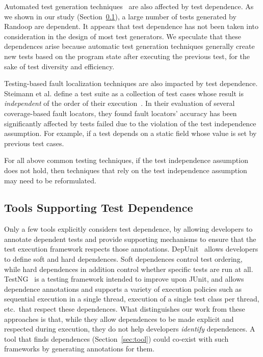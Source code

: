 Automated test generation techniques~\cite{} are also affected
by test dependence. As we shown in our study (Section~\ref{}),
a large number of tests generated by Randoop are dependent.
It appears that test dependence has not been taken into
consideration in the design of most test generators.
We speculate that these dependences arise because automatic
test generation techniques generally create new tests
based on the program state after executing the previous test,
for the sake of test diversity and efficiency. 

Testing-based fault localization techniques are also impacted
by test dependence. Steimann et al. define a test suite as a
collection of test cases whose result is \textit{independent}
of the order of their execution~\cite{Steimann:2013}.
In their evaluation of several coverage-based fault locators, they found
fault locators' accuracy has been significantly affected
by tests failed due to the violation of the test independence assumption.
For example, if a test depends on a static field whose value is
set by previous test cases.  


For all above common testing techniques, if the test independence
assumption does not hold, then techniques that rely on
the test independence assumption may need to be reformulated.

\subsection{Tools Supporting Test Dependence}

Only a few tools explicitly considers test dependence, by
allowing developers to annotate dependent tests and
provide supporting mechanisms to ensure that the test execution framework
respects those annotations.  DepUnit~\cite{depunit}
allows developers to define soft and hard dependences. Soft dependences control
test ordering, while hard dependences in addition control whether specific tests are
run at all.  TestNG~\cite{testng} is a testing framework intended to improve upon JUnit,
and allows dependence annotations and supports a variety of execution policies such as sequential execution
in a single thread, execution of a single test class per thread, etc.\
that respect these dependences.
What distinguishes our work from these approaches is that, while they allow dependences
to be made explicit and respected during execution, they do not help developers
\emph{identify} dependences.  A tool that finds dependences (Section~\ref{sec:tool}) could co-exist
with such frameworks by generating annotations for them.



